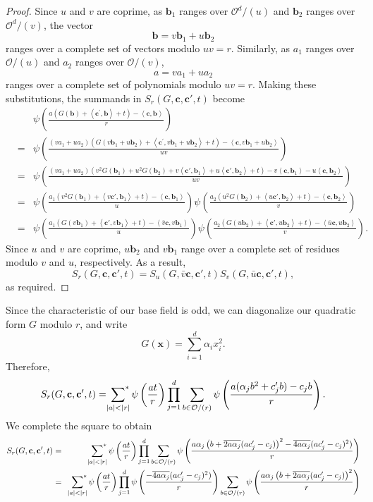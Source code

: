 \documentclass[11pt]{amsart}
\theoremstyle{plain}
\theoremstyle{plain}
\renewcommand{\vec}[1]{\mathbf{#1}}
\theoremstyle{remark}
\theoremstyle{definition}
\newcommand{\sumstar}{\sideset{}{^*}\sum}
\begin{document}
\begin{proof}Since $u$ and $v$ are coprime, as $\vec{b}_1$ ranges over $\mathcal{O}^d/(u)$ and $\vec{b}_2$ ranges over $\mathcal{O}^d/(v)$, the vector
\[\vec{b}=v\vec{b}_1+u\vec{b}_2\]
ranges over a complete set of vectors modulo $uv=r$. Similarly, as $a_1$ ranges over $\mathcal{O}/(u)$ and $a_2$ ranges over $\mathcal{O}/(v)$,
\[a=va_1+ua_2\]
ranges over a complete set of polynomials modulo $uv=r$. Making these substitutions, the summands in $S_r(G,\vec{c},\vec{c}',t)$
become
\begin{eqnarray*}
&&\psi\left(\frac{a(G(\vec{b})+\left<\vec{c}^{\prime},\vec{b}\right>+t)-\left<\vec{c},\vec{b}\right>}{r}\right)\\&=&
\psi\left(\frac{(va_1+ua_2)(G(v\vec{b}_1+u\vec{b}_2)+\left<\vec{c}^{\prime},v\vec{b}_1+u\vec{b}_2\right>+t)-\left<\vec{c},v\vec{b}_1+u\vec{b}_2\right>}{uv}\right)\\&=& 
\psi\left(\frac{(va_1+ua_2)(v^2G(\vec{b}_1)+u^2G(\vec{b}_2)+v\left<\vec{c}',\vec{b}_1\right>+u\left<\vec{c}',\vec{b}_2\right>+t)-v\left<\vec{c},\vec{b}_1\right>-u\left<\vec{c},\vec{b}_2\right>}{uv}\right)\\&=& \psi\left(\frac{a_1(v^2G(\vec{b}_1)+\left<v\vec{c}',\vec{b}_1\right>+t)-\left<\vec{c},\vec{b}_1\right>}{u}\right)\psi\left(\frac{a_2(u^2G(\vec{b}_2)+\left<u\vec{c}',\vec{b}_2\right>+t)-\left<\vec{c},\vec{b}_2\right>}{v}\right)\\&=& \psi\left(\frac{a_1(G(v\vec{b}_1)+\left<\vec{c}',v\vec{b}_1\right>+t)-\left<\bar{v}\vec{c},v\vec{b}_1\right>}{u}\right)\psi\left(\frac{a_2(G(u\vec{b}_2)+\left<\vec{c}',u\vec{b}_2\right>+t)-\left<\bar{u}\vec{c},u\vec{b}_2\right>}{v}\right).
\end{eqnarray*}
Since $u$ and $v$ are coprime, $u\vec{b}_2$ and $v\vec{b}_1$ range over a complete set of residues modulo $v$ and $u$, respectively. As a result,
\[S_r(G,\vec{c},\vec{c}',t)=S_u(G,\bar{v}\vec{c},\vec{c}',t)S_v(G,\bar{u}\vec{c},\vec{c}',t),\]
as required.
\end{proof}
Since the characteristic of our base field is odd, we can diagonalize our quadratic form $G$ modulo $r$, and write
\[G(\vec{x})=\sum_{i=1}^d\alpha_ix_i^2.\]
Therefore,
\[S_r(G,\vec{c},\vec{c}',t)=\sumstar_{|a|<|r|} \psi\left(\frac{at}{r}\right)  \prod_{j=1}^{d} \sum_{b\in\mathcal{O}/(r)} \psi\left(\frac{a(\alpha_jb^2+c_j^{\prime}b)-c_jb}{r} \right).\]
We complete the square to obtain
\begin{eqnarray*}S_r(G,\vec{c},\vec{c}',t)&=&\sumstar_{|a|<|r|} \psi\left(\frac{at}{r}\right)\prod_{j=1}^{d} \sum_{b\in\mathcal{O}/(r)} \psi\left(\frac{a\alpha_j\left(b+\overline{2a\alpha_j}(ac_j'-c_j)\right)^2-\overline{4a\alpha_j}(ac_j^{\prime}-c_j)^2)}{r}\right)
\\
 &=&\sumstar_{|a|<|r|} \psi\left(\frac{at}{r}\right)\prod_{j=1}^{d} \psi\left(\frac{-\overline{4a\alpha_j}(ac_j^{\prime}-c_j)^2)}{r}\right)\sum_{b\in\mathcal{O}/(r)} \psi\left(\frac{a\alpha_j\left(b+\overline{2a\alpha_j}(ac_j'-c_j)\right)^2}{r}\right)  \end{eqnarray*}
\end{document}
